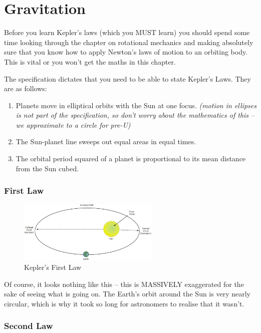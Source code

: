 \documentclass[main.tex]{subfiles}
\begin{document}
\chapter{Gravitation}
Before you learn Kepler's laws (which you MUST learn) you should spend
some time looking through the chapter on rotational mechanics and making
absolutely sure that you know how to apply Newton's laws of motion to an
orbiting body. This is vital or you won't get the maths in this chapter.

The specification dictates that you need to be able to state Kepler's
Laws. They are as follows:
\begin{enumerate}
\item
  Planets move in elliptical orbits with the Sun at one focus.
  \emph{(motion in ellipses is not part of the specification, so don't
  worry about the mathematics of this -- we approximate to a circle for
  pre-U)}
\item
  The Sun-planet line sweeps out equal areas in equal times.
\item
  The orbital period squared of a planet is proportional to its mean
  distance from the Sun cubed.
\end{enumerate}
\newpage
\subsection{First Law}
\begin{figure}[h]
  \includegraphics[width=0.6\textwidth]{figs/chapt-13/image1.jpeg}
  \caption{Kepler's First Law}
  \label{}
\end{figure}

Of course, it looks nothing like this -- this is MASSIVELY exaggerated
for the sake of seeing what is going on. The Earth's orbit around the
Sun is very nearly circular, which is why it took so long for
astronomers to realise that it wasn't.

\subsection{Second Law}
\end{document}
